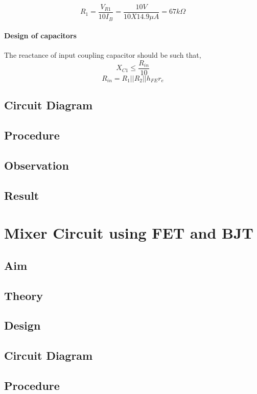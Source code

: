 \documentclass{book}
\begin{document}
\begin{equation}
R_1=\frac{V_{R1}}{10I_B} =\frac{10V}{10X14.9\mu A}=67k\Omega
\end{equation}
\subsubsection{Design of capacitors}
The reactance of input coupling capacitor should be such that,
\begin{equation}
X_{C1} \leq \frac{R_{in}}{10}
\end{equation}
\begin{equation}
R_{in}= R_1 ||R_2 || h_{FE}r_e
\end{equation}
\section*{Circuit Diagram}
\section*{Procedure}
\section*{Observation}
\section*{Result}

\chapter[Mixer Circuit using FET and BJT]{Mixer Circuit using FET and BJT}
\section*{Aim}
\section*{Theory}
\section*{Design}
\section*{Circuit Diagram}
\section*{Procedure}
\end{document}
